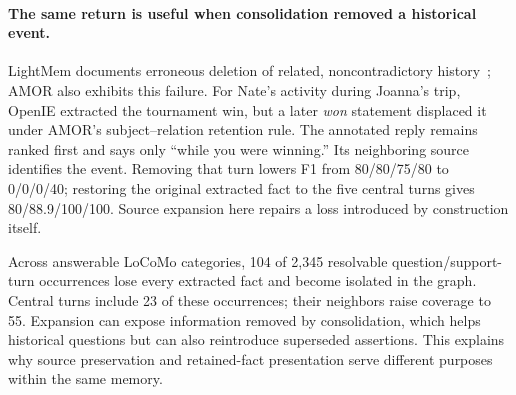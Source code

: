 \paragraph{The same return is useful when consolidation removed a historical event.}
LightMem documents erroneous deletion of related, noncontradictory history~\citep{fang2026lightmem}; AMOR also exhibits this failure.
For Nate's activity during Joanna's trip, OpenIE extracted the tournament win, but a later \emph{won} statement displaced it under AMOR's subject--relation retention rule.
The annotated reply remains ranked first and says only ``while you were winning.''
Its neighboring source identifies the event.
Removing that turn lowers F1 from 80/80/75/80 to 0/0/0/40; restoring the original extracted fact to the five central turns gives 80/88.9/100/100.
Source expansion here repairs a loss introduced by construction itself.

Across answerable LoCoMo categories, 104 of 2,345 resolvable question/support-turn occurrences lose every extracted fact and become isolated in the graph.
Central turns include 23 of these occurrences; their neighbors raise coverage to 55.
Expansion can expose information removed by consolidation, which helps historical questions but can also reintroduce superseded assertions.
This explains why source preservation and retained-fact presentation serve different purposes within the same memory.

